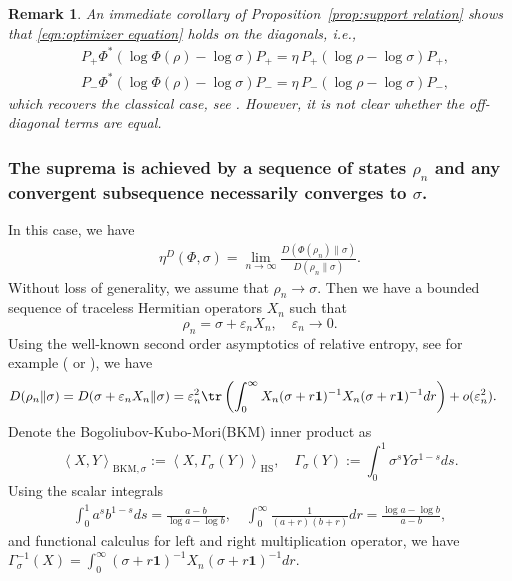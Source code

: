 \documentclass[11pt,reqno]{amsart}
\numberwithin{equation}{section}
\newtheorem{remark}[lemma]{Remark}
\newcommand{\HS}[2]{\left\langle #1,#2\right\rangle_{\mathrm{HS}}} %
\newcommand{\BKM}[2]{\left\langle #1,#2\right\rangle_{\mathrm{BKM},\sigma}} %
\begin{document}
\begin{remark}
    An immediate corollary of Proposition~\ref{prop:support relation} shows that \eqref{eqn:optimizer equation} holds on the diagonals, i.e., 
    \begin{align*}
        & P_+ \Phi^*(\log \Phi(\rho) - \log \sigma) P_+= \eta\, P_+(\log \rho - \log \sigma)P_+,\\
        & P_- \Phi^*(\log \Phi(\rho) - \log \sigma) P_-= \eta\, P_-(\log \rho - \log \sigma)P_-,
    \end{align*}
    which recovers the classical case, see \cite[Lemma 2]{caputo2025entropy}. However, it is not clear whether the off-diagonal terms are equal.
\end{remark}



\subsubsection{The suprema is achieved by a sequence of states $\rho_n$ and any convergent subsequence necessarily converges to $\sigma$. }
In this case, we have 
\begin{align*}
    \eta^D(\Phi,\sigma) = \lim_{n\to \infty} \frac{D(\Phi(\rho_n) \| \sigma)}{D(\rho_n \| \sigma)}. 
\end{align*}
Without loss of generality, we assume that $\rho_n \to \sigma$. Then we have a bounded sequence of traceless Hermitian operators $X_n$ such that 
\begin{equation}
    \rho_n = \sigma + \varepsilon_n X_n, \quad \varepsilon_n\to 0.
\end{equation}
Using the well-known second order asymptotics of relative entropy, see for example (\cite{LGCR} or \cite[Section 4.1]{belzig2024}), we have 
\begin{align}\label{eqn:second order relative entropy}
    D(\rho_n \| \sigma)& = D(\sigma + \varepsilon_n X_n \| \sigma)= \varepsilon_n^2 \tr\left(\int_0^\infty X_n(\sigma + r\textbf{1})^{-1} X_n(\sigma + r\textbf{1})^{-1}dr\right) + o(\varepsilon_n^2).
\end{align}
Denote the Bogoliubov-Kubo-Mori(BKM) inner product as 
\begin{equation}
    \BKM{X}{Y}:= \HS{X}{\Gamma_\sigma(Y)},\quad \Gamma_\sigma(Y) :=\int_0^1 \sigma^s Y \sigma^{1-s} ds.
\end{equation}
Using the scalar integrals 
\begin{align*}
    \int_0^1 a^s b^{1-s}ds = \frac{a-b}{\log a - \log b},\quad \int_0^\infty \frac{1}{(a+r)(b+r)}dr = \frac{\log a - \log b}{a-b},
\end{align*}
and functional calculus for left and right multiplication operator, we have $\Gamma_\sigma^{-1}(X)= \int_0^\infty(\sigma + r\textbf{1})^{-1} X_n(\sigma + r\textbf{1})^{-1}dr$. 
\end{document}
